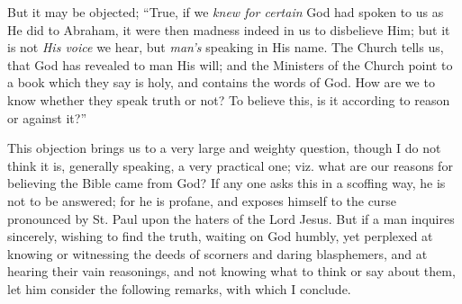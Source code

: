 But it may be objected; ``True, if we \emph{knew for
certain} God had spoken to us as He did to Abraham, it
were then madness indeed in us to disbelieve Him; but it
is not \emph{His voice} we hear, but \emph{man's}
speaking in His name. The Church tells us, that God has
revealed to man His will; and the Ministers of the Church
point to a book which they say is holy, and contains the
words of God. How are we to know whether they speak truth
or not? To believe this, is it according to reason or
against it?''

This objection brings us to a very large and weighty
question, though I do not think it is, generally
speaking, a very practical one; viz. what are our reasons
for believing the Bible came from God? If any one asks
this in a scoffing way, he is not to be answered; for he
is profane, and exposes himself to the curse pronounced
by St. Paul upon the haters of the Lord Jesus. But if a
man inquires sincerely, wishing to find the truth,
waiting on God humbly, yet perplexed at knowing or
witnessing the deeds of scorners and daring blasphemers,
and at hearing their vain reasonings, and not knowing
what to think or say about them, let him consider the
following remarks, with which I conclude.

